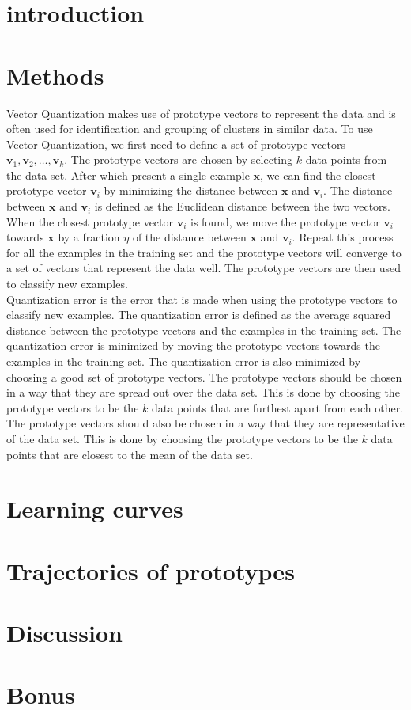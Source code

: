 \documentclass[twoside, a4paper, fleqn, reqno]{article}
\begin{document}
\maketitle

\section{introduction}

\section{Methods}

Vector Quantization makes use of prototype vectors to represent the data and is often used for identification and grouping of clusters in similar data.
To use Vector Quantization, we first need to define a set of prototype vectors $\mathbf{v}_1, \mathbf{v}_2, \ldots, \mathbf{v}_k$.
The prototype vectors are chosen by selecting $k$ data points from the data set.
After which present a single example $\mathbf{x}$, we can find the closest prototype vector $\mathbf{v}_i$ by minimizing the distance between $\mathbf{x}$ and $\mathbf{v}_i$.
The distance between $\mathbf{x}$ and $\mathbf{v}_i$ is defined as the Euclidean distance between the two vectors.
When the closest prototype vector $\mathbf{v}_i$ is found, we move the prototype vector $\mathbf{v}_i$ towards $\mathbf{x}$ by a fraction $\eta$ of the distance between $\mathbf{x}$ and $\mathbf{v}_i$.
Repeat this process for all the examples in the training set and the prototype vectors will converge to a set of vectors that represent the data well.
The prototype vectors are then used to classify new examples. \\

Quantization error is the error that is made when using the prototype vectors to classify new examples.
The quantization error is defined as the average squared distance between the prototype vectors and the examples in the training set.
The quantization error is minimized by moving the prototype vectors towards the examples in the training set.
The quantization error is also minimized by choosing a good set of prototype vectors.
The prototype vectors should be chosen in a way that they are spread out over the data set.
This is done by choosing the prototype vectors to be the $k$ data points that are furthest apart from each other.
The prototype vectors should also be chosen in a way that they are representative of the data set.
This is done by choosing the prototype vectors to be the $k$ data points that are closest to the mean of the data set.

\section{Learning curves}

\section{Trajectories of prototypes}

\section{Discussion}

\section{Bonus}
\end{document}
